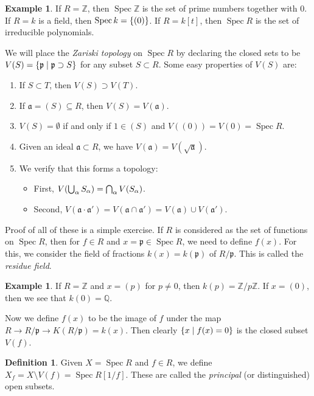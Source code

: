 \documentclass[leqno, openany]{memoir}
\theoremstyle{definition}
\newtheorem{defn}[thm]{Definition}
\newtheorem{exm}[thm]{Example}
\theoremstyle{remark}
\theoremstyle{plain}
\theoremstyle{definition}
\theoremstyle{remark}
\newcommand{\Z}{\mathbb{Z}}
\newcommand{\Q}{\mathbb{Q}}
\newcommand{\mf}[1]{\mathfrak{#1}}
\DeclareMathOperator{\Spec}{Spec}
\begin{document}
\begin{exm} If $R = \Z$, then $\Spec \Z$ is the set of prime numbers together
with $0$. If $R = k$ is a field, then $\Spec k = \qty{(0)}$. If $R = k[t]$,
then $\Spec R$ is the set of irreducible polynomials.  \end{exm}

We will place the \textit{Zariski topology} on $\Spec R$ by declaring the
closed sets to be $V(S) = \qty{\mf{p} \mid \mf{p} \supset S}$ for any subset $S
\subset R$. Some easy properties of $V(S)$ are: \begin{enumerate} \item If $S
    \subset T$, then $V(S) \supset V(T)$.  \item If $\mf{a} = (S) \subseteq R$,
    then $V(S) = V(\mf{a})$.  \item $V(S) = \emptyset$ if and only if $1 \in
    (S)$ and $V((0)) = V(\qty{0}) = \Spec R$.  \item Given an ideal $\mf{a}
    \subset R$, we have $V(\mf{a}) = V(\sqrt{\mf{a}})$.  \item We verify that
    this forms a topology: \begin{itemize} \item First, $V\qty(\bigcup_{\alpha}
        S_{\alpha}) = \bigcap_{\alpha} V(S_{\alpha})$.  \item Second, $V(\mf{a}
        \cdot \mf{a}') = V(\mf{a} \cap \mf{a}') = V(\mf{a}) \cup V(\mf{a}')$.
\end{itemize} \end{enumerate}

Proof of all of these is a simple exercise. If $R$ is considered as the set of
functions on $\Spec R$, then for $f \in R$ and $x = \mf{p} \in \Spec R$, we
need to define $f(x)$. For this, we consider the field of fractions $k(x) =
k(\mf{p})$ of $R/\mf{p}$. This is called the \textit{residue field}. 

\begin{exm} If $R = \Z$ and $x = (p)$ for $p \neq 0$, then $k(p) = \Z/p\Z$. If
$x = (0)$, then we see that $k(0) = \Q$.  \end{exm}

Now we define $f(x)$ to be the image of $f$ under the map $R \to R/\mf{p} \to
K(R/\mf{p}) = k(x)$. Then clearly $\qty{x \mid f(x) = 0}$ is the closed subset
$V(f)$.

\begin{defn} Given $X = \Spec R$ and $f \in R$, we define $X_f = X \setminus
V(f) = \Spec R[1/f]$. These are called the \textit{principal} (or
distinguished) open subsets.  \end{defn}
\end{document}
